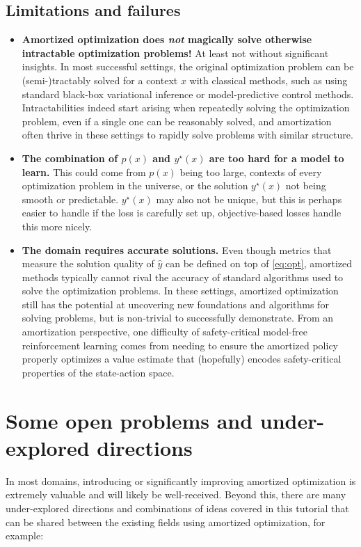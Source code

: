 \subsection*{Limitations and failures}
\begin{itemize}
\item \textbf{Amortized optimization does \emph{not} magically solve otherwise
  intractable optimization problems!}
  At least not without significant insights.
  In most successful settings, the original optimization problem can be
  (semi-)tractably solved for a context $x$ with classical methods,
  such as using standard black-box variational inference
  or model-predictive control methods.
  Intractabilities indeed start arising when repeatedly solving
  the optimization problem, even if a single one can be reasonably solved,
  and amortization often thrive in these settings to rapidly solve
  problems with similar structure.
\item \textbf{The combination of $p(x)$ and $y^\star(x)$ are too hard
  for a model to learn.} This could come from $p(x)$ being too
  large, \eg contexts of every optimization problem in the universe,
  or the solution $y^\star(x)$ not being smooth or predictable.
  $y^\star(x)$ may also not be unique, but this is perhaps easier
  to handle if the loss is carefully set up, \eg objective-based
  losses handle this more nicely.
\item \textbf{The domain requires accurate solutions.}
  Even though metrics that measure the solution quality of $\hat y$
  can be defined on top of \cref{eq:opt}, amortized methods
  typically cannot rival the accuracy of standard algorithms
  used to solve the optimization problems.
  In these settings, amortized optimization still has the
  potential at uncovering new foundations and algorithms
  for solving problems, but is non-trivial to
  successfully demonstrate.
  From an amortization perspective, one difficulty of safety-critical
  model-free reinforcement learning comes from needing to
  ensure the amortized policy properly optimizes a
  value estimate that (hopefully) encodes safety-critical
  properties of the state-action space.
\end{itemize}

\section{Some open problems and under-explored directions}
In most domains, introducing or significantly improving amortized
optimization is extremely valuable and will likely be well-received.
Beyond this, there are many under-explored directions and
combinations of ideas covered in this tutorial that can
be shared between the existing fields using amortized optimization,
for example:

